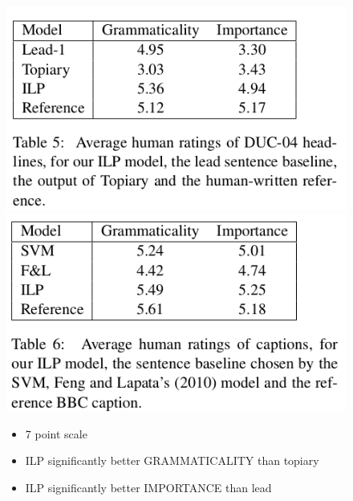 \documentclass[xcolor={table}]{beamer}
\begin{document}
\begin{frame}[t]{\cite{woodsend2010generation}}
      \begin{figure}[h]
          \centering
      \includegraphics[scale=.25]{images/table5-woodsend10} \\
      \includegraphics[scale=.25]{images/table6-woodsend10} \\
      \begin{itemize}
              \small
          \item 7 point scale\\ 
          \item ILP significantly better GRAMMATICALITY than topiary\\
          \item ILP significantly better IMPORTANCE than lead\\
      \end{itemize}
  \end{figure}
\end{frame}
\end{document}
